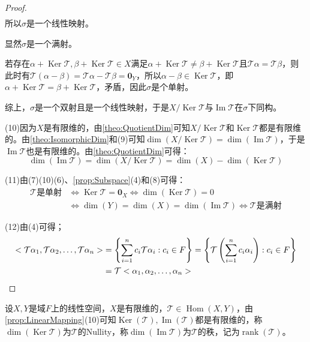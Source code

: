 \begin{proof}
\begin{align*}
	\end{align*}
	所以$\sigma$是一个线性映射。\par
	显然$\sigma$是一个满射。\par
	若存在$\alpha+\operatorname{Ker}\mathcal{T},\beta+\operatorname{Ker}\mathcal{T}\in X$满足$\alpha+\operatorname{Ker}\mathcal{T}\ne\beta+\operatorname{Ker}\mathcal{T}$且$\mathcal{T}\alpha=\mathcal{T}\beta$，则此时有$\mathcal{T}(\alpha-\beta)=\mathcal{T}\alpha-\mathcal{T}\beta=\mathbf{0}_Y$，所以$\alpha-\beta\in\operatorname{Ker}\mathcal{T}$，即$\alpha+\operatorname{Ker}\mathcal{T}=\beta+\operatorname{Ker}\mathcal{T}$，矛盾，因此$\sigma$是个单射。\par
	综上，$\sigma$是一个双射且是一个线性映射，于是$X/\operatorname{Ker}\mathcal{T}$与$\operatorname{Im}\mathcal{T}$在$\sigma$下同构。\par
	(10)因为$X$是有限维的，由\cref{theo:QuotientDim}可知$X/\operatorname{Ker}\mathcal{T}$和$\operatorname{Ker}\mathcal{T}$都是有限维的。由\cref{theo:IsomorphicDim}和(9)可知$\dim(X/\operatorname{Ker}\mathcal{T})=\dim(\operatorname{Im}\mathcal{T})$，于是$\operatorname{Im}\mathcal{T}$也是有限维的。由\cref{theo:QuotientDim}可得：
	\begin{equation*}
		\dim(\operatorname{Im}\mathcal{T})=\dim(X/\operatorname{Ker}\mathcal{T})=\dim(X)-\dim(\operatorname{Ker}\mathcal{T})
	\end{equation*}\par
	(11)由(7)(10)(6)、\cref{prop:Subspace}(4)和(8)可得：
	\begin{align*}
		\mathcal{T}\text{是单射}
		&\iff\operatorname{Ker}\mathcal{T}=\mathbf{0}_X	\iff\dim(\operatorname{Ker}\mathcal{T})=0 \\
		&\iff\dim(Y)=\dim(X)=\dim(\operatorname{Im}\mathcal{T})
		\iff\mathcal{T}\text{是满射}
	\end{align*}\par
	(12)由(4)可得；
	\begin{align*}
		<\mathcal{T}\alpha_1, \mathcal{T}\alpha_2, \dots, \mathcal{T}\alpha_{n}>&=\left\{\sum_{i=1}^{n}c_i\mathcal{T}\alpha_i:c_i\in F\right\}=\left\{\mathcal{T}\left(\sum_{i=1}^{n}c_i\alpha_i\right):c_i\in F\right\} \\
		&=\mathcal{T}<\alpha_1, \alpha_2, \dots, \alpha_{n}>\qedhere
	\end{align*}
\end{proof}
\begin{definition}
	设$X,Y$是域$F$上的线性空间，$X$是有限维的，$\mathcal{T}\in\operatorname{Hom}(X,Y)$，由\cref{prop:LinearMapping}(10)可知$\operatorname{Ker}(\mathcal{T}),\operatorname{Im}(\mathcal{T})$都是有限维的，称$\dim(\operatorname{Ker}\mathcal{T})$为$\mathcal{T}$的\gls{Nullity}，称$\dim(\operatorname{Im}\mathcal{T})$为$\mathcal{T}$的秩，记为$\operatorname{rank}(\mathcal{T})$。
\end{definition}
